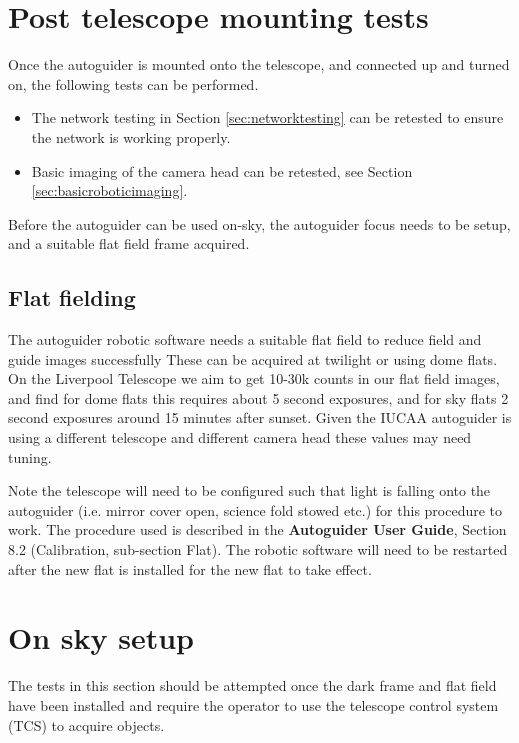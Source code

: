 \documentclass[10pt,a4paper]{article}
\begin{document}
\section{Post telescope mounting tests}

Once the autoguider is mounted onto the telescope, and connected up and turned on, the following tests can be performed.
\begin{itemize}
\item The network testing in Section \ref{sec:networktesting} can be retested to ensure the network is working properly.\item Basic imaging of the camera head can be retested, see Section \ref{sec:basicroboticimaging}.
\end{itemize}

Before the autoguider can be used on-sky, the autoguider focus needs to be setup, and a suitable flat field frame acquired.

\subsection{Flat fielding}

The autoguider robotic software needs a suitable flat field to reduce field and guide images successfully These can be acquired at twilight or using dome flats. On the Liverpool Telescope we aim to get 10-30k counts in our flat field images, and find for dome flats this requires about 5 second exposures, and for sky flats 2 second exposures around 15 minutes after sunset. Given the IUCAA autoguider is using a different telescope and different camera head these values may need tuning.

Note the telescope will need to be configured such that light is
falling onto the autoguider (i.e. mirror cover open, science fold stowed etc.) for this
procedure to work. The procedure used is described in the {\bf Autoguider User Guide}, Section 8.2 (Calibration, sub-section Flat). The robotic software will need to be restarted after the new flat is installed for the new flat to take effect.

\section{On sky setup}

The tests in this section should be attempted once the dark frame and
flat field have been installed and require the operator to use the
telescope control system (TCS) to acquire objects.
\end{document}

